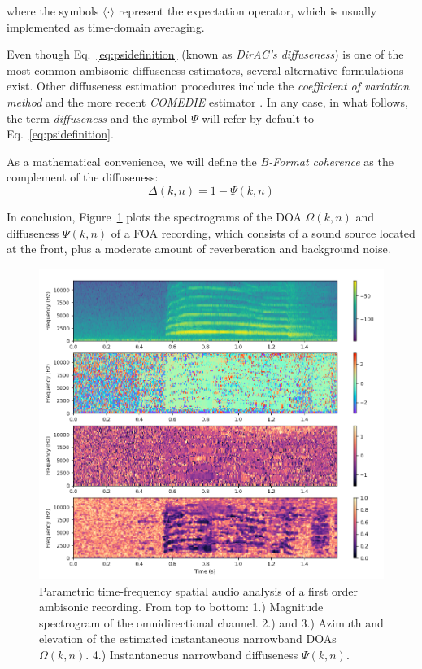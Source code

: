  where the symbols $\langle \cdot \rangle$ represent the expectation operator, which is usually implemented as time-domain averaging. 

Even though Eq.~\ref{eq:psidefinition} (known as \textit{DirAC's diffuseness}) is one of the most common ambisonic diffuseness estimators, several alternative formulations exist. 
Other diffuseness estimation procedures include the \textit{coefficient of variation method} \cite{ahonen2009diffuseness} and the more recent \textit{COMEDIE} estimator \cite{epain2016spherical}. 
In any case, in what follows, the term \textit{diffuseness} and the symbol $\Psi$ will refer by default to Eq.~\ref{eq:psidefinition}. 

As a mathematical convenience, we will define the \textit{B-Format coherence} as the complement of the diffuseness:
\begin{equation}
	\Delta(k,n) = 1 - \Psi(k,n) 
	\label{eq:delta}
\end{equation}

In conclusion, Figure~\ref{fig:dirac} plots the spectrograms of the DOA $\Omega(k,n)$ and diffuseness $\Psi(k,n)$ of a FOA recording, which consists of a sound source located at the front, plus a moderate amount of reverberation and background noise. 

\begin{figure}[h!]
	\begin{center}
	\includegraphics[width=\textwidth]{Figures/Introduction/spectrograms.png}
	\caption{Parametric time-frequency spatial audio analysis of a first order ambisonic recording. From top to bottom: 1.) Magnitude spectrogram of the omnidirectional channel. 2.) and 3.) Azimuth and elevation of the estimated instantaneous narrowband DOAs $\Omega(k,n)$. 4.) Instantaneous narrowband diffuseness $\Psi(k,n)$.}
	\label{fig:dirac}
	\end{center}
\end{figure}




